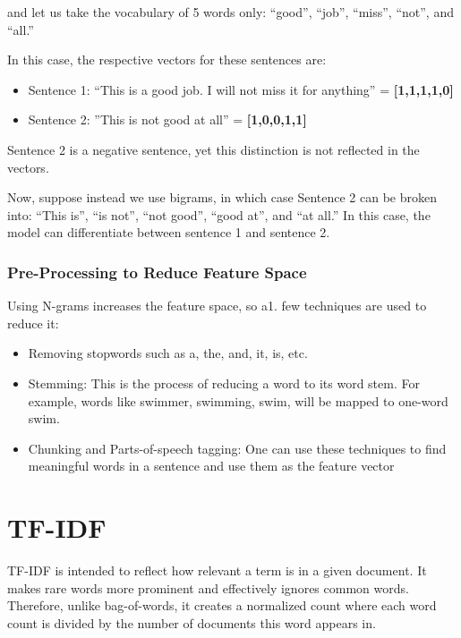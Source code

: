 \documentclass[
]{book}
\providecommand{\tightlist}{%
  \setlength{\itemsep}{0pt}\setlength{\parskip}{0pt}}
\begin{document}
and let us take the vocabulary of 5 words only: ``good'', ``job'', ``miss'', ``not'', and ``all.''

In this case, the respective vectors for these sentences are:

\begin{itemize}
\tightlist
\item
  Sentence 1: ``This is a good job. I will not miss it for anything'' = \textbf{{[}1,1,1,1,0{]}}
\item
  Sentence 2: ''This is not good at all'' = \textbf{{[}1,0,0,1,1{]}}
\end{itemize}

Sentence 2 is a negative sentence, yet this distinction is not reflected in the vectors.

Now, suppose instead we use bigrams, in which case Sentence 2 can be broken into: ``This is'', ``is not'', ``not good'', ``good at'', and ``at all.'' In this case, the model can differentiate between sentence 1 and sentence 2.

\hypertarget{pre-processing-to-reduce-feature-space}{%
\subsubsection{Pre-Processing to Reduce Feature Space}\label{pre-processing-to-reduce-feature-space}}

Using N-grams increases the feature space, so a1. few techniques are used to reduce it:

\begin{itemize}
\tightlist
\item
  Removing stopwords such as a, the, and, it, is, etc.
\item
  Stemming: This is the process of reducing a word to its word stem. For example, words like swimmer, swimming, swim, will be mapped to one-word swim.
\item
  Chunking and Parts-of-speech tagging: One can use these techniques to find meaningful words in a sentence and use them as the feature vector
\end{itemize}

\hypertarget{tf-idf}{%
\section{TF-IDF}\label{tf-idf}}

TF-IDF is intended to reflect how relevant a term is in a given document. It makes rare words more prominent and effectively ignores common words. Therefore, unlike bag-of-words, it creates a normalized count where each word count is divided by the number of documents this word appears in.
\end{document}
